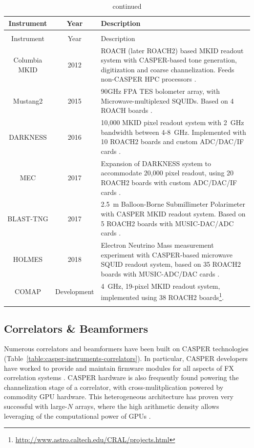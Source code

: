 \documentclass{ws-jai}
\begin{document}
\begin{longtable}{ccp{10cm}}
  \caption{MKID readout systems powered by CASPER hardware.}\\
  Instrument & Year & Description \\
  \hline \endfirsthead
  \caption[]{continued}\\
  Instrument & Year & Description \\
  \hline \endhead
  Columbia MKID    & 2012 & ROACH (later ROACH2) based MKID readout system with CASPER-based tone generation, digitization and coarse channelization. Feeds non-CASPER HPC processors \citep{mccarrick_2014}. \\
  Mustang2         & 2015 & 90GHz FPA TES bolometer array, with Microwave-multiplexed SQUIDs. Based on 4 ROACH boards \citep{2016JLTP..184..460S, 2014JLTP..176..808D}.  \\
  DARKNESS         & 2016 & 10,000 MKID pixel readout system with 2~GHz bandwidth between 4-8~GHz. Implemented with 10 ROACH2 boards and custom ADC/DAC/IF cards \citep{meeker2015design}. \\
  MEC              & 2017 & Expansion of DARKNESS system to accommodate 20,000 pixel readout, using 20 ROACH2 boards with custom ADC/DAC/IF cards \citep{meeker2015design}. \\
  BLAST-TNG        & 2017 &  2.5~m Balloon-Borne Submillimeter Polarimeter with CASPER MKID readout system. Based on 5 ROACH2 boards with MUSIC-DAC/ADC cards \citep{galitzki2014balloon}. \\
  HOLMES           & 2018 & Electron Neutrino Mass measurement experiment with CASPER-based microwave SQUID readout system, based on 35 ROACH2 boards with MUSIC-ADC/DAC cards \citep{Alpert2015, Ferri2016179}. \\
  COMAP            & Development & 4~GHz, 19-pixel MKID readout system, implemented using 38 ROACH2 boards\footnote{\url{http://www.astro.caltech.edu/CRAL/projects.html}}. \\
  \label{table:casper-instruments-mkids}
\end{longtable}


\subsection{Correlators \& Beamformers}

Numerous correlators and beamformers have been built on CASPER technologies (Table~\ref{table:casper-instruments-correlators}). In particular, CASPER developers have worked to provide and maintain firmware modules for all aspects of FX correlation systems \citep{parsons2008scalable}. CASPER hardware is also frequently found powering the channelization stage of a correlator, with cross-mulitplication powered by commodity GPU hardware. This heterogeneous architecture has proven very successful with large-$N$ arrays, where the high arithmetic density allows leveraging of the computational power of GPUs \citep{scalable-gpu-fpga, chime-correlator}.
\end{document}
